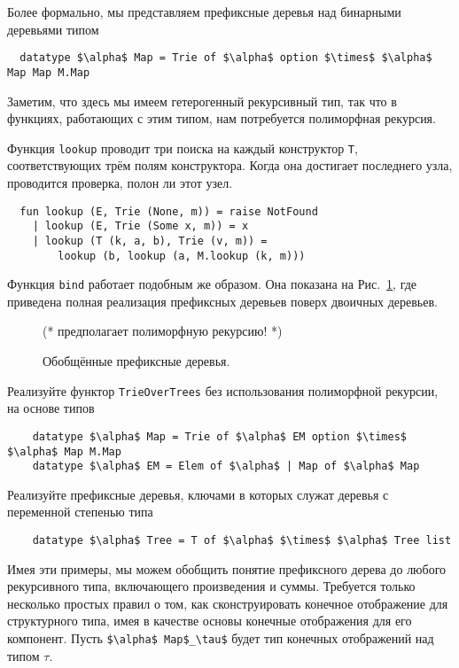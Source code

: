 Более формально, мы представляем префиксные деревья над бинарными
деревьями типом
\begin{lstlisting}
  datatype $\alpha$ Map = Trie of $\alpha$ option $\times$ $\alpha$ Map Map M.Map
\end{lstlisting}
Заметим, что здесь мы имеем гетерогенный рекурсивный тип, так что в
функциях, работающих с этим типом, нам потребуется полиморфная
рекурсия.

Функция \lstinline!lookup! проводит три поиска на каждый конструктор
\lstinline!T!, соответствующих трём полям конструктора. Когда она
достигает последнего узла, проводится проверка, полон ли этот узел.
\begin{lstlisting}
  fun lookup (E, Trie (None, m)) = raise NotFound
    | lookup (E, Trie (Some x, m)) = x
    | lookup (T (k, a, b), Trie (v, m)) =
        lookup (b, lookup (a, M.lookup (k, m)))
\end{lstlisting}
Функция \lstinline!bind! работает подобным же образом. Она показана на
Рис.~\ref{fig:10.11}, где приведена полная реализация префиксных
деревьев поверх двоичных деревьев.

\begin{figure}
  \centering
  (* $\mbox{предполагает полиморфную рекурсию!}$ *)
  \caption{Обобщённые префиксные деревья.}
  \label{fig:10.11}
\end{figure}

\begin{exercise}\label{ex:10.12}
  Реализуйте функтор \lstinline!TrieOverTrees! без использования
  полиморфной рекурсии, на основе типов
  \begin{lstlisting}
    datatype $\alpha$ Map = Trie of $\alpha$ EM option $\times$ $\alpha$ Map M.Map
    datatype $\alpha$ EM = Elem of $\alpha$ | Map of $\alpha$ Map
  \end{lstlisting}
\end{exercise}

\begin{exercise}
  Реализуйте префиксные деревья, ключами в которых служат деревья с
  переменной степенью типа
  \begin{lstlisting}
    datatype $\alpha$ Tree = T of $\alpha$ $\times$ $\alpha$ Tree list
  \end{lstlisting}
\end{exercise}

Имея эти примеры, мы можем обобщить понятие префиксного дерева до
любого рекурсивного типа, включающего произведения и суммы. Требуется
только несколько простых правил о том, как сконструировать конечное
отображение для структурного типа, имея в качестве основы конечные
отображения для его компонент. Пусть \lstinline!$\alpha$ Map$_\tau$!
будет тип конечных отображений над типом $\tau$.

